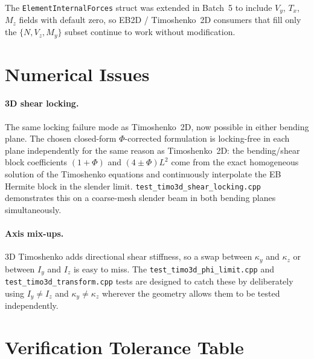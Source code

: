 \documentclass[11pt,a4paper]{article}
\begin{document}
The \texttt{ElementInternalForces} struct was extended in Batch~5 to include $V_y$, $T_x$, $M_z$ fields with default zero, so EB2D / Timoshenko~2D consumers that fill only the $\{N, V_z, M_y\}$ subset continue to work without modification.

\section{Numerical Issues}

\paragraph{3D shear locking.}
The same locking failure mode as Timoshenko~2D, now possible in either bending plane. The chosen closed-form $\Phi$-corrected formulation is locking-free in each plane independently for the same reason as Timoshenko~2D: the bending/shear block coefficients $(1+\Phi)$ and $(4\pm\Phi)L^2$ come from the exact homogeneous solution of the Timoshenko equations and continuously interpolate the EB Hermite block in the slender limit. \texttt{test\_timo3d\_shear\_locking.cpp} demonstrates this on a coarse-mesh slender beam in both bending planes simultaneously.

\paragraph{Axis mix-ups.}
3D Timoshenko adds directional shear stiffness, so a swap between $\kappa_y$ and $\kappa_z$ or between $I_y$ and $I_z$ is easy to miss. The \texttt{test\_timo3d\_phi\_limit.cpp} and \texttt{test\_timo3d\_transform.cpp} tests are designed to catch these by deliberately using $I_y \ne I_z$ and $\kappa_y \ne \kappa_z$ wherever the geometry allows them to be tested independently.

\section{Verification Tolerance Table}
\end{document}
